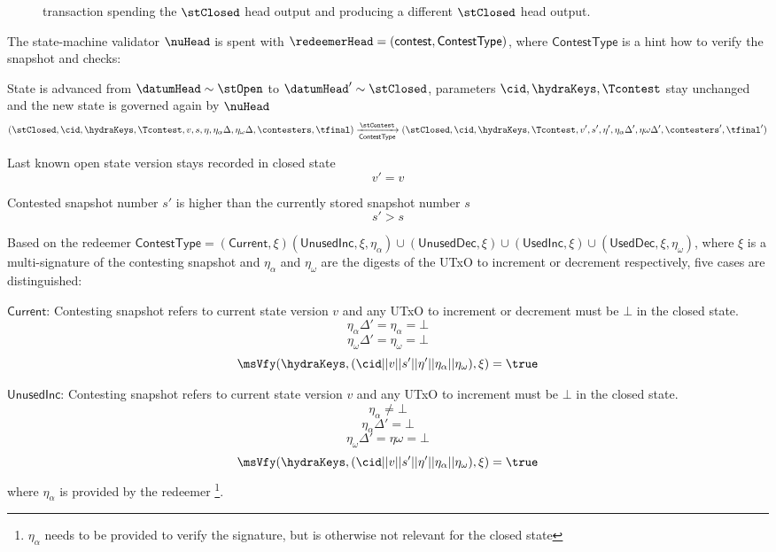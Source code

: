 \begin{figure}
  
  \caption{\mtxContest{} transaction spending the $\stClosed$ head output and
	producing a different $\stClosed$ head output.}\label{fig:contestTx}
\end{figure}

\noindent The state-machine validator $\nuHead$ is spent with
$\redeemerHead = (\mathsf{contest}, \mathsf{ContestType})$, where
$\mathsf{ContestType}$ is a hint how to verify the snapshot and checks:
\begin{menumerate}
  \item State is advanced from $\datumHead \sim \stOpen$ to
  $\datumHead' \sim \stClosed$, parameters $\cid,\hydraKeys,\Tcontest$
  stay unchanged and the new state is governed again by $\nuHead$
  \[
	(\stClosed,\cid,\hydraKeys,\Tcontest,v,s,\eta,\eta_\alpha\Delta,\eta_\omega\Delta,\contesters,\tfinal) \xrightarrow[\mathsf{ContestType}]{\stContest} (\stClosed,\cid,\hydraKeys,\Tcontest,v',s',\eta',\eta_\alpha\Delta',\eta\omega\Delta',\contesters',\tfinal')
  \]

  \item Last known open state version stays recorded in closed state
  \[
	v' = v
  \]

  \item Contested snapshot number $s'$ is higher than the currently stored snapshot number $s$
  \[
	s' > s
  \]
  \item Based on the redeemer $\mathsf{ContestType} = (\mathsf{Current}, \xi) (\mathsf{UnusedInc}, \xi, \eta_\alpha) \cup (\mathsf{UnusedDec}, \xi) \cup (\mathsf{UsedInc}, \xi)  \cup (\mathsf{UsedDec}, \xi, \eta_\omega)$, where $\xi$ is a multi-signature of the contesting snapshot and $\eta_\alpha$ and $\eta_\omega$ are the digests of the UTxO to increment or decrement respectively, five cases are distinguished:

  \begin{menumerate}
	\item $\mathsf{Current}$: Contesting snapshot refers to current state version $v$ and any UTxO to increment or decrement must be $\bot$ in the closed state.
	  \[
		\eta_\alpha\Delta' = \eta_\alpha =  \bot
	  \]
	  \[
		\eta_\omega\Delta' = \eta_\omega =  \bot
	  \]
	  \[
		\msVfy(\hydraKeys,(\cid || v || s' || \eta' || \eta_\alpha || \eta_\omega),\xi) = \true
	  \]
	\item $\mathsf{UnusedInc}$: Contesting snapshot refers to current state version $v$ and any UTxO to increment must be $\bot$ in the closed state.
	  \[
	    \eta_\alpha  \neq \bot
	  \]
	  \[
	    \eta_\alpha\Delta' = \bot
	  \]
	  \[
		\eta_\omega\Delta' = \eta\omega = \bot
	  \]
	  \[
		\msVfy(\hydraKeys,(\cid || v || s' || \eta' || \eta_\alpha || \eta_\omega),\xi) = \true
	  \]
	  where $\eta_\alpha$ is provided by the redeemer \footnote{$\eta_\alpha$ needs to be provided to verify the signature, but is otherwise not relevant for the closed state}.


\end{menumerate}
\end{menumerate}
